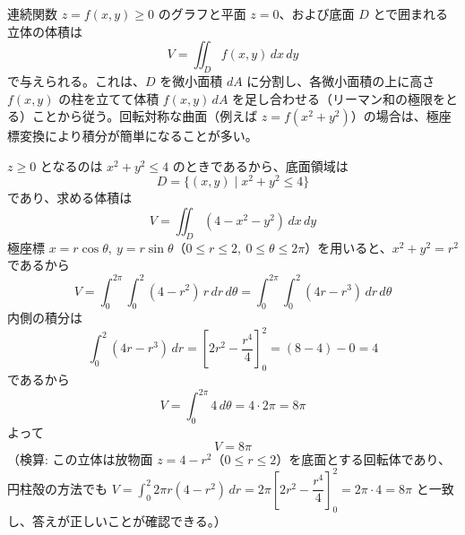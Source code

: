 
連続関数 $z = f(x,y) \ge 0$ のグラフと平面 $z=0$、および底面 $D$ とで囲まれる立体の体積は
\[
V = \iint_{D} f(x,y)\,dx\,dy
\]
で与えられる。これは、$D$ を微小面積 $dA$ に分割し、各微小面積の上に高さ $f(x,y)$ の柱を立てて体積 $f(x,y)\,dA$ を足し合わせる（リーマン和の極限をとる）ことから従う。回転対称な曲面（例えば $z = f(x^2+y^2)$）の場合は、極座標変換により積分が簡単になることが多い。

$z \ge 0$ となるのは $x^{2}+y^{2} \le 4$ のときであるから、底面領域は
\[
D = \{(x,y) \mid x^{2}+y^{2} \le 4\}
\]
であり、求める体積は
\[
V = \iint_{D} (4 - x^{2} - y^{2})\,dx\,dy
\]
極座標 $x=r\cos\theta,\ y=r\sin\theta$（$0\le r\le 2,\ 0\le\theta\le 2\pi$）を用いると、$x^2+y^2=r^2$ であるから
\[
V = \int_{0}^{2\pi}\int_{0}^{2} (4 - r^{2})\, r\,dr\,d\theta
= \int_{0}^{2\pi}\int_{0}^{2} (4r - r^{3})\,dr\,d\theta
\]
内側の積分は
\[
\int_{0}^{2} (4r - r^{3})\,dr = \left[2r^{2} - \frac{r^{4}}{4}\right]_{0}^{2} = (8 - 4) - 0 = 4
\]
であるから
\[
V = \int_{0}^{2\pi} 4\,d\theta = 4 \cdot 2\pi = 8\pi
\]
よって
\[
\boxed{\; V = 8\pi \;}
\]
（検算: この立体は放物面 $z=4-r^2$（$0\le r\le2$）を底面とする回転体であり、円柱殻の方法でも
$V = \int_0^2 2\pi r (4-r^2)\,dr = 2\pi\left[2r^2 - \dfrac{r^4}{4}\right]_0^2 = 2\pi\cdot4 = 8\pi$
と一致し、答えが正しいことが確認できる。）
